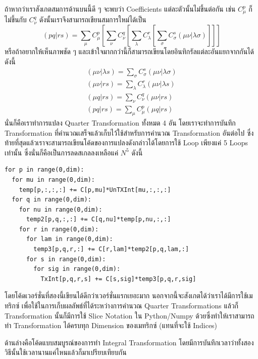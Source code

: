 ถ้าหากว่าเราสังเกตสมการด้านบนนี้ดี ๆ จะพบว่า Coefficients แต่ละตัวนั้นไม่ขึ้นต่อกัน เช่น $C^{p}_\mu$ ก็ไม่ขึ้นกับ $C^{q}_\nu$ ดังนั้นเราจึงสามารถเขียนสมการใหม่ได้เป็น
%
\begin{equation}
  (pq\vert rs)
  =
  \sum_\mu C^{p}_\mu
  [\sum_\nu C^{q}_\nu
    [\sum_\lambda C^{r}_\lambda
      [\sum_\sigma C^{s}_\sigma(\mu\nu\vert \lambda\sigma)]]]
\end{equation}
%
หรือถ้าอยากให้เห็นภาพชัด ๆ และเข้าใจมากกว่านี้ก็สามารถเขียนโดยอินทิกรัลแต่ละอันแยกจากกันได้ ดังนี้
%
\begin{gather}
  (\mu\nu\vert \lambda s) = \sum_\sigma C^{s}_\sigma(\mu\nu\vert \lambda\sigma) \\
  (\mu\nu\vert rs) = \sum_\lambda C^{r}_\lambda(\mu\nu\vert \lambda s) \\
  (\mu q\vert rs) = \sum_\nu C^{q}_\nu(\mu\nu\vert rs) \\
  (pq\vert rs) = \sum_\mu C^{p}_\mu(\mu q\vert rs)
\end{gather}
%
นั่นก็คือเราทำการแปลง Quarter Transformation ทั้งหมด 4 อัน โดยเราจะทำการบันทึก Transformation ที่คำนวณเสร็จแล้วเก็บไว้ใช้สำหรับการคำนวณ Transformation อันต่อไป ซึ่งท้ายที่สุดแล้วเราจะสามารถเขียนโค้ดของการแปลงดังกล่าวได้โดยการใช้ Loop เพียงแค่ 5 Loops เท่านั้น ซึ่งนั่นก็คือเป็นการลดสเกลลงเหลือแค่ $N^{5}$ ดังนี้

\vspace{5pt}

\begin{lstlisting}[style=MyPython]
for p in range(0,dim):  
  for mu in range(0,dim):  
    temp[p,:,:,:] += C[p,mu]*UnTXInt[mu,:,:,:]  
  for q in range(0,dim):  
    for nu in range(0,dim):  
      temp2[p,q,:,:] += C[q,nu]*temp[p,nu,:,:]  
    for r in range(0,dim):  
      for lam in range(0,dim):  
        temp3[p,q,r,:] += C[r,lam]*temp2[p,q,lam,:]  
      for s in range(0,dim):  
        for sig in range(0,dim):  
          TxInt[p,q,r,s] += C[s,sig]*temp3[p,q,r,sig]
\end{lstlisting}

\vspace{5pt}

\noindent โดยโค้ดเวอร์ชั่นที่สองนี้เขียนได้ดีกว่าเวอร์ชั่นแรกเยอะมาก นอกจากนี้จะสังเกตได้ว่าเราได้มีการใช้เมทริกซ์  เพื่อใช้ในการเก็บผลลัพธ์ที่ได้ระหว่างการคำนวณ Quarter Transformations แล้วก็ Transformation นั้นก็มีการใช้ Slice Notation ใน Python/Numpy ด้วยซึ่งทำให้เราสามารถทำ Transformation ได้ครบทุก Dimension ของเมทริกซ์ (แทนที่จะใช้ Indices)

ด้านล่างคือโค้ดแบบสมบูรณ์ของการทำ Integral Transformation โดยมีการบันทึกเวลาว่าทั้งสองวิธีนั้นใช้เวลานานแค่ไหนแล้วก็มาเปรียบเทียบกัน


